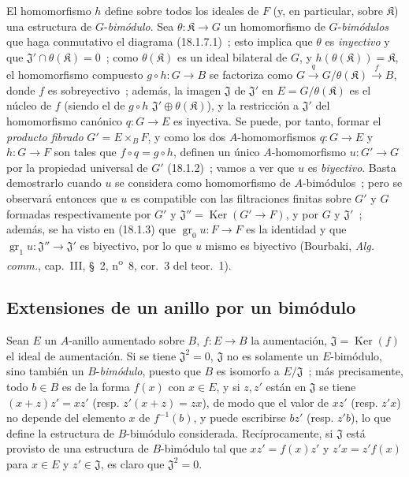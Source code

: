 \begin{env}[18.1.7]
El homomorfismo $h$ define sobre todos los ideales de $F$ (y, en particular, sobre
$\mathfrak K$) una estructura de $G$-\emph{bimódulo}. Sea
$\theta:\mathfrak K\to G$ un homomorfismo de $G$-\emph{bimódulos} que haga
conmutativo el diagrama (18.1.7.1)~; esto implica que $\theta$ es
\emph{inyectivo} y que $\mathfrak{J}'\cap\theta(\mathfrak K)=0$~; como
$\theta(\mathfrak K)$ es un ideal bilateral de $G$, y
$h(\theta(\mathfrak K))=\mathfrak K$, el homomorfismo compuesto
$g\circ h:G\to B$ se factoriza como
$G\xrightarrow{q}G/\theta(\mathfrak K)\xrightarrow{f}B$, donde $f$ es
sobreyectivo~; además, la imagen $\mathfrak{J}$ de $\mathfrak{J}'$ en
$E=G/\theta(\mathfrak K)$ es el núcleo de $f$ (siendo el de $g\circ h$
$\mathfrak{J}'\oplus\theta(\mathfrak K)$), y la restricción a
$\mathfrak{J}'$ del homomorfismo canónico $q:G\to E$ es inyectiva. Se
puede, por tanto, formar el \emph{producto fibrado} $G'=E\times_BF$, y como los dos
$A$-homomorfismos $q:G\to E$ y $h:G\to F$ son tales que
$f\circ q=g\circ h$, definen un único $A$-homomorfismo $u:G'\to G$
por la propiedad universal de $G'$ (18.1.2)~; vamos a ver que $u$ es
\emph{biyectivo}. Basta demostrarlo cuando $u$ se considera como
homomorfismo de $A$-bimódulos~; pero se observará entonces que $u$ es compatible
con las filtraciones finitas sobre $G'$ y $G$ formadas respectivamente por $G'$
y $\mathfrak{J}''=\operatorname{Ker}(G'\to F)$, y por $G$ y
$\mathfrak{J}'$~; además, se ha visto en (18.1.3) que
$\operatorname{gr}_0u:F\to F$ es la identidad y que
$\operatorname{gr}_1u:\mathfrak{J}''\to\mathfrak{J}'$ es biyectivo, por lo que $u$
mismo es biyectivo (Bourbaki, \emph{Alg. comm.}, cap.~III, \S~2,
n\textsuperscript{o}~8, cor.~3 del teor.~1).
\end{env}

\subsection{Extensiones de un anillo por un bimódulo}
\label{subsection:0.18.2-es}

\begin{env}[18.2.1]
\label{0.18.2.1-es}
Sean $E$ un $A$-anillo aumentado sobre $B$, $f:E\to B$ la aumentación,
$\mathfrak{J}=\operatorname{Ker}(f)$ el ideal de aumentación. Si se tiene
$\mathfrak{J}^2=0$, $\mathfrak{J}$ no es solamente un $E$-bimódulo, sino
también un $B$-\emph{bimódulo}, puesto que $B$ es isomorfo a
$E/\mathfrak{J}$~; más precisamente, todo $b\in B$ es de la forma $f(x)$
con $x\in E$, y si $z,z'$ están en $\mathfrak{J}$ se tiene
$(x+z)z'=xz'$ (resp. $z'(x+z)=zx$), de modo que el valor de $xz'$ (resp.
$z'x$) no depende del elemento $x$ de $f^{-1}(b)$, y puede escribirse $bz'$
(resp. $z'b$), lo que define la estructura de $B$-bimódulo considerada.
Recíprocamente, si $\mathfrak{J}$ está provisto de una estructura de $B$-bimódulo tal
que $xz'=f(x)z'$ y $z'x=z'f(x)$ para $x\in E$ y
$z'\in\mathfrak{J}$, es claro que $\mathfrak{J}^2=0$.
\end{env}

